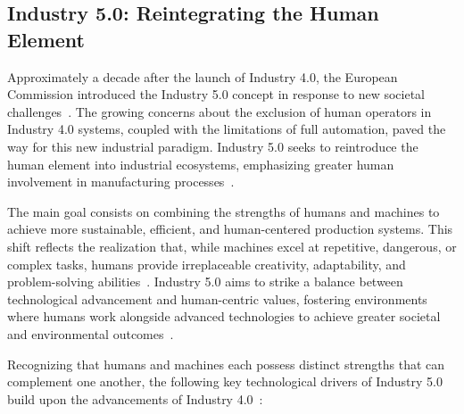 \subsection{Industry 5.0: Reintegrating the Human Element}

Approximately a decade after the launch of Industry 4.0, the European Commission introduced the Industry 5.0 concept in response to new societal challenges~\cite{industry5}. The growing concerns about the exclusion of human operators in Industry 4.0 systems, coupled with the limitations of full automation, paved the way for this new industrial paradigm. Industry 5.0 seeks to reintroduce the human element into industrial ecosystems, emphasizing greater human involvement in manufacturing processes~\cite{su11164371}.

The main goal consists on combining the strengths of humans and machines to achieve more sustainable, efficient, and human-centered production systems. This shift reflects the realization that, while machines excel at repetitive, dangerous, or complex tasks, humans provide irreplaceable creativity, adaptability, and problem-solving abilities~\cite{10577684}. Industry 5.0 aims to strike a balance between technological advancement and human-centric values, fostering environments where humans work alongside advanced technologies to achieve greater societal and environmental outcomes~\cite{GOLOVIANKO2023102}.


Recognizing that humans and machines each possess distinct strengths that can complement one another, the following key technological drivers of Industry 5.0 build upon the advancements of Industry 4.0~\cite{10577684}:

